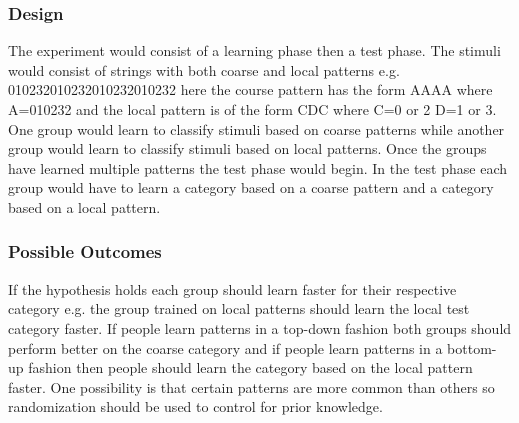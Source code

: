 \documentclass[doc]{apa}%
\begin{document}
\subsubsection{Design}
The experiment would consist of a learning phase then a test phase.  The stimuli would consist of strings with both coarse and local patterns e.g. 010232010232010232010232 here the course pattern has the form AAAA where A=010232 and the local pattern is of the form CDC where C=0 or 2 D=1 or 3.  One group would learn to classify stimuli based on coarse patterns while another group would learn to classify stimuli based on local patterns.  Once the groups have learned multiple patterns the test phase would begin.  In the test phase each group would have to learn a category based on a coarse pattern and a category based on a local pattern.  
\subsubsection{Possible Outcomes}
If the hypothesis holds each group should learn faster for their respective category e.g. the group trained on local patterns should learn the local test category faster.  If people learn patterns in a top-down fashion both groups should perform better on the coarse category and if people learn patterns in a bottom-up fashion then people should learn the category based on the local pattern faster.  One possibility is that certain patterns are more common than others so randomization should be used to control for prior knowledge.


\end{document}
